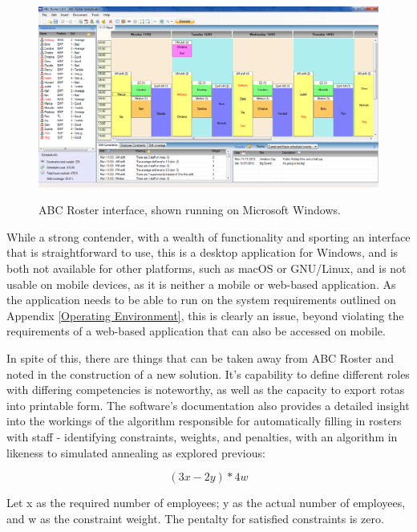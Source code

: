 \begin{figure}[!ht]
    \includegraphics[width=\textwidth]{Figures/abcroster}
    \caption{ABC Roster interface, shown running on Microsoft Windows.}
    \label{fig:abc} \cite{ABC1}
\end{figure}

While a strong contender, with a wealth of functionality and sporting an interface that is straightforward to use, this is a desktop application for Windows, and is both not available for other platforms, such as macOS or GNU/Linux, and is not usable on mobile devices, as it is neither a mobile or web-based application. As the application needs to be able to run on the system requirements outlined on Appendix \ref{Operating Environment}, this is clearly an issue, beyond violating the requirements of a web-based application that can also be accessed on mobile.

In spite of this, there are things that can be taken away from ABC Roster and noted in the construction of a new solution. It's capability to define different roles with differing competencies is noteworthy, as well as the capacity to export rotas into printable form. \cite{ABC1} The software's documentation also provides a detailed insight into the workings of the algorithm responsible for automatically filling in rosters with staff - identifying constraints, weights, and penalties, with an algorithm in likeness to simulated annealing as explored previous:

\[ (3x - 2y) * 4w \]

Let x as the required number of employees; y as the actual number of employees, and w as the constraint weight. The pentalty for satisfied constraints is zero. \cite{ABC2}

